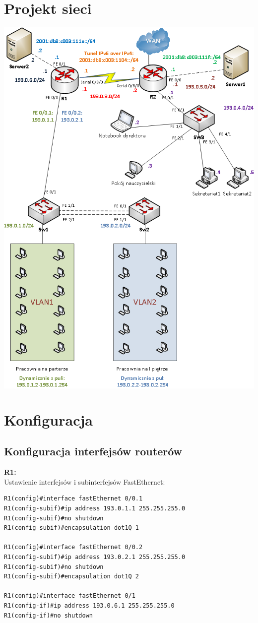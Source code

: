 \documentclass[11pt,a4paper]{article}
\begin{document}
\section{Projekt sieci}
\includegraphics[scale=0.6]{siec.png}  

\section{Konfiguracja}

\subsection{Konfiguracja interfejsów routerów}
{\bf R1:}\\
\noindent
Ustawienie interfejsów i subinterfejsów FastEthernet:
\begin{lstlisting}
R1(config)#interface fastEthernet 0/0.1
R1(config-subif)#ip address 193.0.1.1 255.255.255.0
R1(config-subif)#no shutdown
R1(config-subif)#encapsulation dot1Q 1

R1(config)#interface fastEthernet 0/0.2
R1(config-subif)#ip address 193.0.2.1 255.255.255.0
R1(config-subif)#no shutdown
R1(config-subif)#encapsulation dot1Q 2

R1(config)#interface fastEthernet 0/1
R1(config-if)#ip address 193.0.6.1 255.255.255.0
R1(config-if)#no shutdown
\end{lstlisting}
\end{document}
